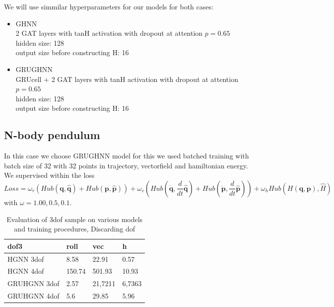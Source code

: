 We will use simmilar hyperparameters for our models for both cases:
\begin{itemize}
	\item GHNN\\ 
	2 GAT layers with tanH activation with dropout at attention $p=0.65$\\
	hidden size: 128\\
	output size before constructing H: 16
	\item GRUGHNN\\ 
	GRUcell + 2 GAT layers with tanH activation with dropout at attention $p=0.65$\\
	hidden size: 128\\
	output size before constructing H: 16
\end{itemize}

\subsection{N-body pendulum}
In this case we choose GRUGHNN model for this we used batched training with batch size of 32 with 32 points in trajectory, vectorfield and hamiltonian energy. We supervised within the loss
\begin{equation}
	Loss =  \omega_r(Hub({\mathbf{q}},\hat{\mathbf{q}}) + Hub({\mathbf{p}},\hat{\mathbf{p}})) +
	\omega_v(Hub(\dot{\mathbf{q}},\frac{d}{dt}\hat{\mathbf{q}}) + Hub(\dot{\mathbf{p}},\frac{d}{dt}\hat{\mathbf{p}})) +
	\omega_h Hub(H(\mathbf{q},\mathbf{p}),\hat{H}) 
\end{equation} with $\omega ={1.00,0.5,0.1}$.
\begin{table}[h!]
	\centering
	\caption{Evaluation of 3dof sample on various models and training procedures, Discarding dof} %
	\label{tab:my_label}               %
	\begin{tabular}{|l|l|l|l|}
		\hline
		dof3 & roll & vec & h\\ 
		\hline
		HGNN 3dof & 8.58 & 22.91 & 0.57 \\  
		\hline
		HGNN 4dof & 150.74 & 501.93 & 10.93 \\  
		\hline
		GRUHGNN 3dof & 2.57 & 21,7211 & 6,7363 \\  
		\hline
		GRUHGNN 4dof & 5.6 & 29.85 & 5.96 \\  
		\hline
	\end{tabular}
\end{table}
